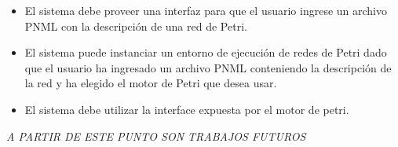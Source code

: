\begin{enumerate}
	\begin{itemize}
	    \item El sistema debe proveer una interfaz para que el usuario ingrese un
	    archivo PNML con la descripción de una red de Petri.
	    \item El sistema puede instanciar un entorno de ejecución de redes de
	    Petri dado que el usuario ha ingresado un archivo PNML conteniendo la
	    descripción de la red y ha elegido el motor de Petri que desea usar. 
	    \item El sistema debe utilizar la interface expuesta por el motor de
	    petri.
	\end{itemize}
	
	
	\emph{\color{red} A PARTIR DE ESTE PUNTO SON TRABAJOS FUTUROS}


\end{enumerate}
